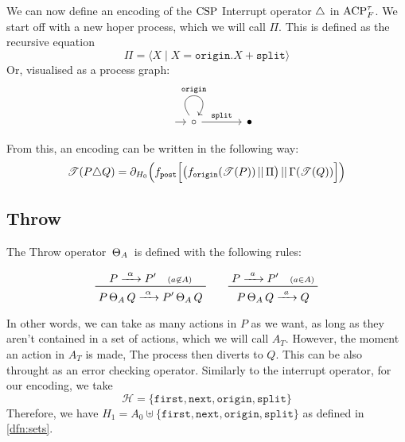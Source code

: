 \documentclass[../hons_project.tex]{subfiles}
\begin{document}
We can now define an encoding of the $\mathrm{CSP}$ Interrupt operator $\triangle$ in $\mathrm{ACP}_{F}^{\tau}$. We start off with a new hoper process, which we will call $\Pi$. This is defined as the recursive equation
\[\Pi = \langle X \mid X = \mathtt{origin}.X + \mathtt{split} \rangle\]
Or, visualised as a process graph:
\[\begin{tikzcd}[column sep=scriptsize, row sep=scriptsize]
		{} & \circ && \bullet
		\arrow[shorten <=8pt, from=1-1, to=1-2]
		\arrow["{\mathtt{origin}}", from=1-2, to=1-2, loop, in=55, out=125, distance=10mm]
		\arrow["{\mathtt{split}}", from=1-2, to=1-4]
	\end{tikzcd}\]

From this, an encoding can be written in the following way:
\[\mathscr{T}(P \triangle Q) = \partial_{H_{0}}\Bigl(f_{\mathtt{post}}\Bigl[ \bigl(f_{\mathtt{origin}}(\mathscr{T}(P)) \,\vert\vert\, \Pi\bigr) \,\vert\vert\, \Gamma(\mathscr{T}(Q)) \Bigr]\Bigr)\]
\subsection{Throw}\label{ssec:throw}

The Throw operator $\,\Theta_{A}\,$ is defined with the following rules:

\[\prftree{P \prightarrow{\alpha} P' \quad \scriptstyle(a\not\in A)}{P \throw Q \prightarrow{\alpha} P' \throw Q} \qquad \prftree{P \prightarrow{a} P' \quad \scriptstyle(a\in A)}{P \throw Q \prightarrow{a} Q }\]

In other words, we can take as many actions in $P$ as we want, as long as they aren't contained in a set of actions, which we will call $A_{T}$. However, the moment an action in $A_{T}$ is made, The process then diverts to $Q$. This can be also throught as an error checking operator. Similarly to the interrupt operator, for our encoding, we take
\[\mathscr{H} = \{\mathtt{first}, \mathtt{next}, \mathtt{origin}, \mathtt{split}\}\]
Therefore, we have $H_{1} = A_{0} \uplus \{\mathtt{first}, \mathtt{next}, \mathtt{origin}, \mathtt{split}\}$ as defined in \ref{dfn:sets}.
\end{document}
